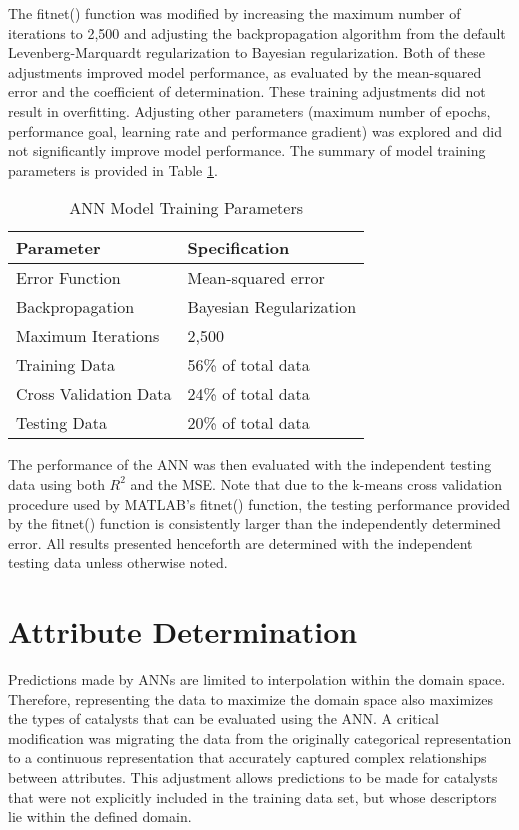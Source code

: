 The fitnet() function was modified by increasing the maximum number of iterations to 2,500 and adjusting the backpropagation algorithm from the default Levenberg-Marquardt regularization to Bayesian regularization. Both of these adjustments improved model performance, as evaluated by the mean-squared error and the coefficient of determination. These training adjustments did not result in overfitting. Adjusting other parameters (maximum number of epochs, performance goal, learning rate and performance gradient) was explored and did not significantly improve model performance. The summary of model training parameters is provided in Table \ref{table:training params}. 
		\begin{table}[ht]
			\centering
			\caption{ANN Model Training Parameters}
			\label{table:training params}
			\begin{tabular}{l|l}
			\textbf{Parameter}    & \textbf{Specification}  \\ \hline
			Error Function        & Mean-squared error      \\
			Backpropagation       & Bayesian Regularization \\
			Maximum Iterations    & 2,500                   \\
			Training Data         & 56\% of total data      \\
			Cross Validation Data & 24\% of total data      \\
			Testing Data          & 20\% of total data     
			\end{tabular}
			\end{table}

The performance of the ANN was then evaluated with the independent testing data using both \(R^2\) and the MSE. Note that due to the k-means cross validation procedure used by MATLAB's fitnet() function, the testing performance provided by the fitnet() function is consistently larger than the independently determined error. All results presented henceforth are determined with the independent testing data unless otherwise noted. 

\section{Attribute Determination}
Predictions made by ANNs are limited to interpolation within the domain space. Therefore, representing the data to maximize the domain space also maximizes the types of catalysts that can be evaluated using the ANN. A critical modification was migrating the data from the originally categorical representation to a continuous representation that accurately captured complex relationships between attributes. This adjustment allows predictions to be made for catalysts that were not explicitly included in the training data set, but whose descriptors lie within the defined domain. 

